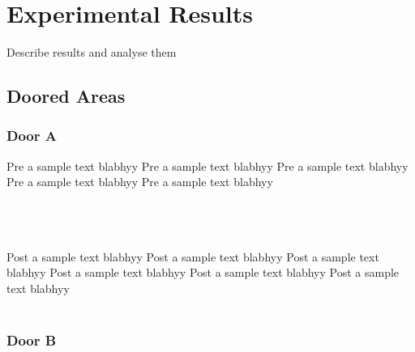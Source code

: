 

  \chapter{Experimental Results}
  Describe results and analyse them

  \section{ Doored Areas }

  \subsection { Door A }
  Pre a sample text blabhyy
  Pre a sample text blabhyy
  Pre a sample text blabhyy
  Pre a sample text blabhyy
  Pre a sample text blabhyy \\ \\

  \begin{table}[H!]
  \centering
  \caption{Door A Data Overview}
  \end{table}


  \\ \\ Post a sample text blabhyy
  Post a sample text blabhyy
  Post a sample text blabhyy
  Post a sample text blabhyy
  Post a sample text blabhyy
  Post a sample text blabhyy \\ \\

  \subsection { Door B }

